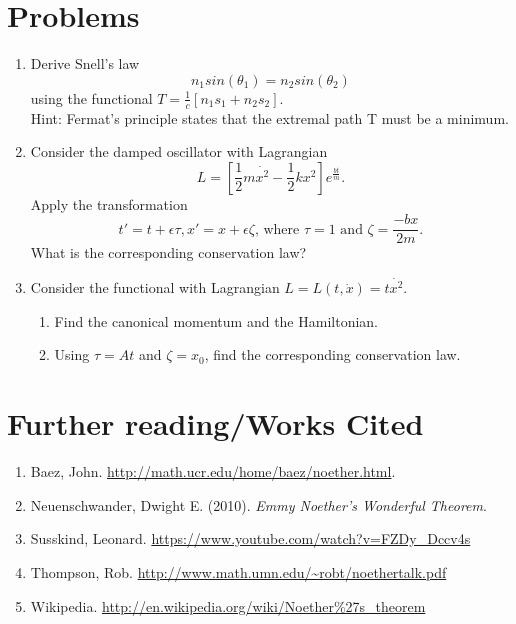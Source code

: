 \documentclass[11pt]{article}
\begin{document}
\section{Problems}
\begin{enumerate}

\item Derive Snell's law
$$n_1sin(\theta_1)=n_2sin(\theta_2)$$
 using the functional $T=\frac{1}{c}[n_1s_1+n_2s_2].$\\
Hint: Fermat's principle states that the extremal path T must be a minimum.

\item Consider the damped oscillator with Lagrangian
$$L=[\frac{1}{2}m\dot{x^2}-\frac{1}{2}kx^2]e^{\frac{bt}{m}}.$$
Apply the transformation
$$t'=t+\epsilon\tau, x'=x+\epsilon\zeta\textrm{, where }\tau=1\textrm{ and }\zeta=\frac{-bx}{2m}.$$
What is the corresponding conservation law?

\item Consider the functional with Lagrangian $L=L(t,\dot{x})=t\dot{x^2}.$
\begin{enumerate}
\item Find the canonical momentum and the Hamiltonian.
\item Using $\tau=At$ and $\zeta=x_0$, find the corresponding conservation law.
\end{enumerate}
\end{enumerate}

\section{Further reading/Works Cited}
\begin{enumerate}
\item Baez, John. \url{http://math.ucr.edu/home/baez/noether.html}.
\item Neuenschwander, Dwight E. (2010). \emph{Emmy Noether's Wonderful Theorem}.
\item Susskind, Leonard. \url{https://www.youtube.com/watch?v=FZDy_Dccv4s}
\item Thompson, Rob. \url{http://www.math.umn.edu/~robt/noethertalk.pdf}
\item Wikipedia. \url{http://en.wikipedia.org/wiki/Noether%27s_theorem}
\end{enumerate}
\end{document}
